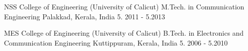 


\begin{cventries}


\cventry
{NSS College of Engineering (University of Calicut)} %
{M.Tech. in Communication Engineering} %
{Palakkad, Kerala, India} %
{5. 2011 - 5.2013} %
{ %
\begin{cvitems}
\end{cvitems}
}

\cventry
{MES College of Engineering (University of Calicut)} %
{B.Tech. in Electronics and Communication Engineering} %
{Kuttippuram, Kerala, India} %
{5. 2006 - 5.2010 } %
{ %
\begin{cvitems}
\end{cvitems}
}


\end{cventries}